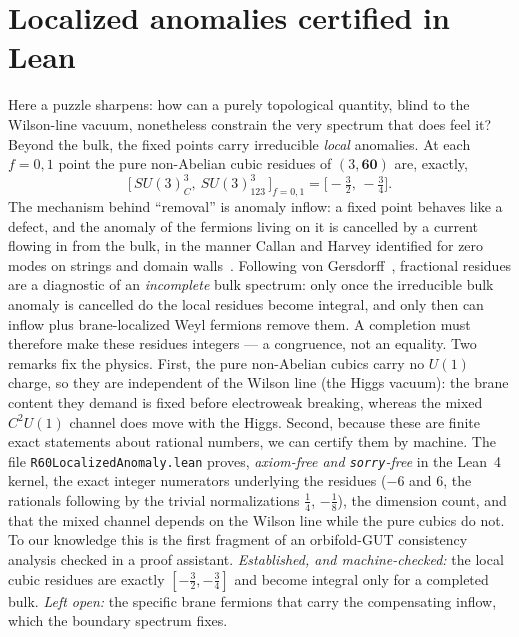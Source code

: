 \documentclass[11pt,a4paper]{article}
\begin{document}
\section{Localized anomalies certified in Lean}\label{sec:localized}
Here a puzzle sharpens: how can a purely topological quantity, blind to the Wilson-line
vacuum, nonetheless constrain the very spectrum that does feel it? Beyond the bulk, the
fixed points carry irreducible \emph{local} anomalies. At each
$f=0,1$ point the pure non-Abelian cubic residues of $(3,\mathbf{60})$ are, exactly,
\begin{equation}
\big[\,SU(3)_C^3,\ SU(3)_{123}^3\,\big]_{f=0,1}=\Big[-\tfrac32,\,-\tfrac34\Big].
\end{equation}
The mechanism behind ``removal'' is anomaly inflow: a fixed point behaves like a defect,
and the anomaly of the fermions living on it is cancelled by a current flowing in from
the bulk, in the manner Callan and Harvey identified for zero modes on strings and
domain walls~\cite{CallanHarvey}. Following von Gersdorff~\cite{GdV6D}, fractional
residues are a diagnostic of an \emph{incomplete} bulk spectrum: only once the
irreducible bulk anomaly is cancelled do the local residues become integral, and only
then can inflow plus brane-localized Weyl fermions remove them. A completion must therefore make these residues integers --- a congruence,
not an equality. Two remarks fix the physics. First, the pure non-Abelian cubics carry
no $U(1)$ charge, so they are independent of the Wilson line (the Higgs vacuum): the
brane content they demand is fixed before electroweak breaking, whereas the mixed
$C^2U(1)$ channel does move with the Higgs. Second, because these are finite exact
statements about rational numbers, we can certify them by machine. The file
\texttt{R60LocalizedAnomaly.lean} proves, \emph{axiom-free and \texttt{sorry}-free} in
the Lean~4 kernel, the exact integer numerators underlying the residues ($-6$ and $6$,
the rationals following by the trivial normalizations $\tfrac14$, $-\tfrac18$), the
dimension count, and that the mixed channel depends on the Wilson line while the pure
cubics do not. To our knowledge this is the first fragment of an orbifold-GUT
consistency analysis checked in a proof assistant.
\emph{Established, and machine-checked:} the local cubic residues are exactly
$[-\tfrac32,-\tfrac34]$ and become integral only for a completed bulk. \emph{Left open:}
the specific brane fermions that carry the compensating inflow, which the boundary
spectrum fixes.

\end{document}
